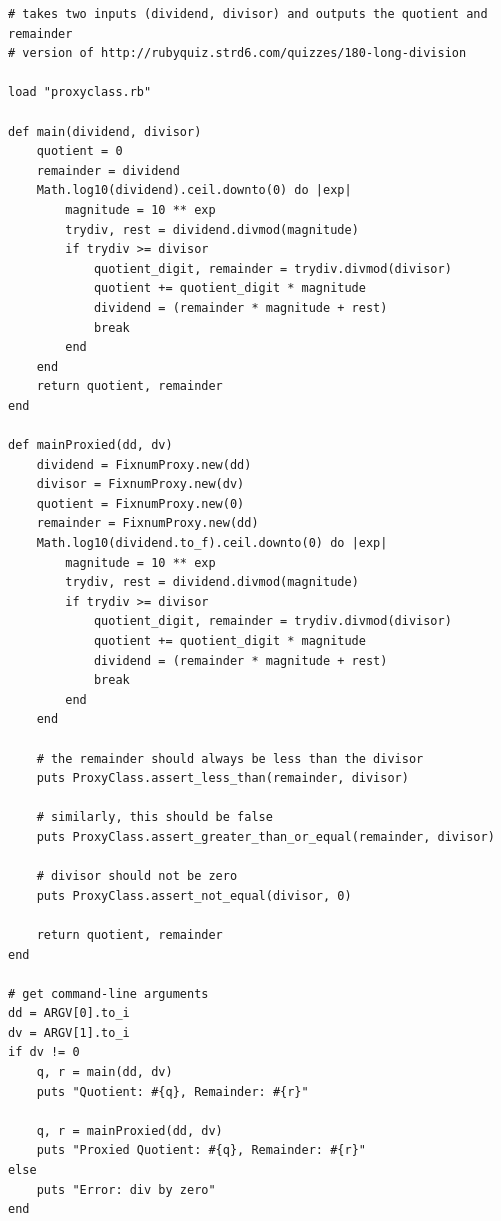 \documentclass[10pt]{article}
\begin{document}
\begin{verbatim}
# takes two inputs (dividend, divisor) and outputs the quotient and remainder
# version of http://rubyquiz.strd6.com/quizzes/180-long-division

load "proxyclass.rb"

def main(dividend, divisor)
	quotient = 0
	remainder = dividend
	Math.log10(dividend).ceil.downto(0) do |exp|
		magnitude = 10 ** exp
		trydiv, rest = dividend.divmod(magnitude)
		if trydiv >= divisor
			quotient_digit, remainder = trydiv.divmod(divisor)
			quotient += quotient_digit * magnitude
			dividend = (remainder * magnitude + rest)
			break
		end
	end
	return quotient, remainder
end

def mainProxied(dd, dv)
	dividend = FixnumProxy.new(dd)
	divisor = FixnumProxy.new(dv)
	quotient = FixnumProxy.new(0)
	remainder = FixnumProxy.new(dd)
	Math.log10(dividend.to_f).ceil.downto(0) do |exp|
		magnitude = 10 ** exp
		trydiv, rest = dividend.divmod(magnitude)
		if trydiv >= divisor
			quotient_digit, remainder = trydiv.divmod(divisor)
			quotient += quotient_digit * magnitude
			dividend = (remainder * magnitude + rest)
			break
		end
	end
	
	# the remainder should always be less than the divisor
	puts ProxyClass.assert_less_than(remainder, divisor)
	
	# similarly, this should be false
	puts ProxyClass.assert_greater_than_or_equal(remainder, divisor)
	
	# divisor should not be zero
	puts ProxyClass.assert_not_equal(divisor, 0)
	
	return quotient, remainder
end

# get command-line arguments
dd = ARGV[0].to_i
dv = ARGV[1].to_i
if dv != 0
	q, r = main(dd, dv)
	puts "Quotient: #{q}, Remainder: #{r}"
	
	q, r = mainProxied(dd, dv)
	puts "Proxied Quotient: #{q}, Remainder: #{r}"
else
	puts "Error: div by zero"
end
\end{verbatim}
\end{document}
